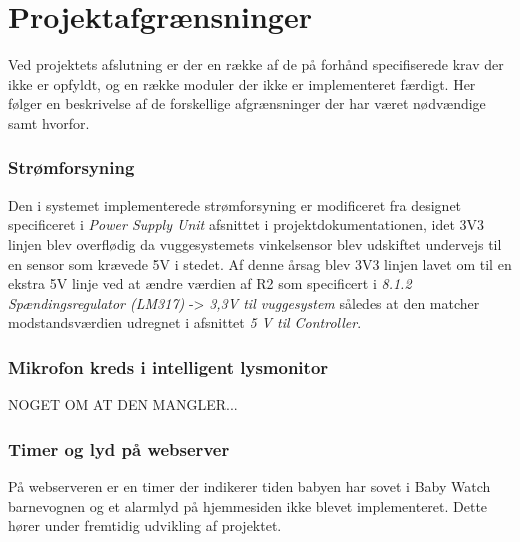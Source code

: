 %
\chapter{Projektafgrænsninger}
\label{projektafgraensninger}
Ved projektets afslutning er der en række af de på forhånd specifiserede krav der ikke er opfyldt, og en række moduler der ikke er implementeret færdigt. Her følger en beskrivelse af de forskellige afgrænsninger der har været nødvændige samt hvorfor. 

\subsection{Strømforsyning}
Den i systemet implementerede strømforsyning er modificeret fra designet specificeret i \textit{Power Supply Unit} afsnittet i projektdokumentationen, idet 3V3 linjen blev overflødig da vuggesystemets vinkelsensor blev udskiftet undervejs til en sensor som krævede 5V i stedet. Af denne årsag blev 3V3 linjen lavet om til en ekstra 5V linje ved at ændre værdien af R2 som specificert i \textit{8.1.2 Spændingsregulator (LM317)} -> \textit{3,3V til vuggesystem} således at den matcher modstandsværdien udregnet i afsnittet \textit{5 V til Controller}.

\subsection{Mikrofon kreds i intelligent lysmonitor}
NOGET OM AT DEN MANGLER...

\subsection{Timer og lyd på webserver}
På webserveren er en timer der indikerer tiden babyen har sovet i Baby Watch barnevognen og et alarmlyd på hjemmesiden ikke blevet implementeret. Dette hører under fremtidig udvikling af projektet. 

